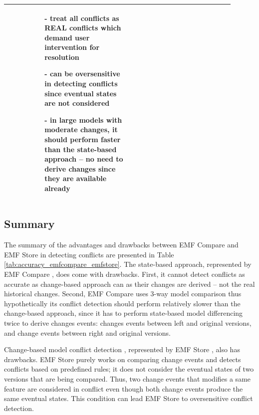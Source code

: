 \begin{table}[]
\begin{tabular}{|p{0.1\linewidth}|p{0.4\linewidth}|p{0.4\linewidth}|}
    &
    \begin{minipage}[t]{\linewidth}
      \raggedright
      \begin{itemize}[leftmargin=9pt]
        \setlength\itemsep{2pt}
        \item[-] treat all conflicts as \textsf{REAL} conflicts which demand user intervention for resolution
        \item[-] can be oversensitive in detecting conflicts since eventual states are not considered
        \item[-] in large models with moderate changes, it should perform faster than the state-based approach -- no need to derive changes since they are available already 
        \item[]
      \end{itemize} 
    \end{minipage}
    \\
    \hline                         
  \end{tabular}
\end{table}

\subsection{Summary}
\label{sec:summary}
The summary of the advantages and drawbacks between EMF Compare and EMF Store in detecting conflicts are presented in Table \ref{tab:accuracy_emfcompare_emfstore}. The state-based approach, represented by EMF Compare \cite{emfcompare2018developer}, does come with drawbacks. First, it cannot detect conflicts as accurate as change-based approach can as their changes are derived -- not the real historical changes. Second, EMF Compare uses 3-way model comparison \cite{emfcompare2018developer} thus hypothetically its conflict detection should perform relatively slower than the change-based approach, since it has to perform state-based model differencing twice to derive changes events: changes events between left and original versions, and change events between right and original versions. 

Change-based model conflict detection \cite{koegel2010operation}, represented by EMF Store \cite{emfstore2019what}, also has drawbacks. EMF Store purely works on comparing change events and detects conflicts based on predefined rules; it does not consider the eventual states of two versions that are being compared. Thus, two change events that modifies a same feature are considered in conflict even though both change events produce the same eventual states. This condition can lead EMF Store to oversensitive conflict detection. 


